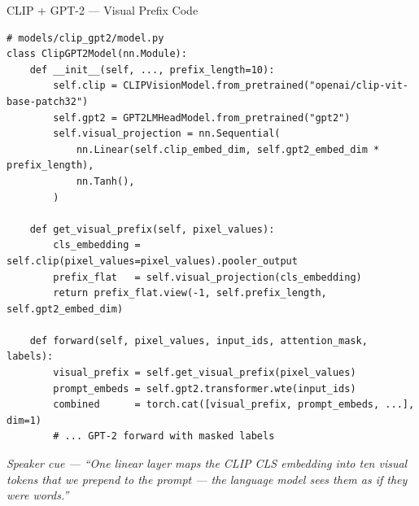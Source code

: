 \documentclass[10pt, aspectratio=169]{beamer}
\newcommand{\speakercue}[1]{%
  \vfill
  {\footnotesize\itshape\color{gray}Speaker cue --- #1}%
}
\begin{document}
\begin{frame}[fragile]{CLIP + GPT-2 --- Visual Prefix Code}
  \begin{lstlisting}
# models/clip_gpt2/model.py
class ClipGPT2Model(nn.Module):
    def __init__(self, ..., prefix_length=10):
        self.clip = CLIPVisionModel.from_pretrained("openai/clip-vit-base-patch32")
        self.gpt2 = GPT2LMHeadModel.from_pretrained("gpt2")
        self.visual_projection = nn.Sequential(
            nn.Linear(self.clip_embed_dim, self.gpt2_embed_dim * prefix_length),
            nn.Tanh(),
        )

    def get_visual_prefix(self, pixel_values):
        cls_embedding = self.clip(pixel_values=pixel_values).pooler_output
        prefix_flat   = self.visual_projection(cls_embedding)
        return prefix_flat.view(-1, self.prefix_length, self.gpt2_embed_dim)

    def forward(self, pixel_values, input_ids, attention_mask, labels):
        visual_prefix = self.get_visual_prefix(pixel_values)
        prompt_embeds = self.gpt2.transformer.wte(input_ids)
        combined      = torch.cat([visual_prefix, prompt_embeds, ...], dim=1)
        # ... GPT-2 forward with masked labels
  \end{lstlisting}
  \speakercue{``One linear layer maps the CLIP CLS embedding into ten visual
  tokens that we prepend to the prompt --- the language model sees them as
  if they were words.''}
\end{frame}
\end{document}
